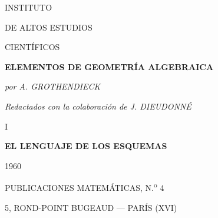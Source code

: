 \begin{titlepage}
\centering
{\Large INSTITUTO\par}
\vspace{0.4em}
{\Large DE ALTOS ESTUDIOS\par}
\vspace{0.4em}
{\Large CIENTÍFICOS\par}
\vfill
{\Large\bfseries ELEMENTOS DE GEOMETRÍA ALGEBRAICA\par}
\vspace{1.5em}
{\large\itshape por A. GROTHENDIECK\par}
\vspace{0.7em}
{\itshape Redactados con la colaboración de J. DIEUDONNÉ\par}
\vspace{2em}
I
\vspace{1.5em}
{\Large\bfseries EL LENGUAJE DE LOS ESQUEMAS\par}
\vfill
{\Large 1960\par}
\vspace{1.2em}
{\Large PUBLICACIONES MATEMÁTICAS, N.\textsuperscript{o} 4\par}
\vspace{0.5em}
{\large 5, ROND-POINT BUGEAUD --- PARÍS (XVI)\par}
\end{titlepage}
\thispagestyle{empty}
\vspace*{\fill}
\begin{center}
\end{center}
\vspace*{\fill}
\clearpage
